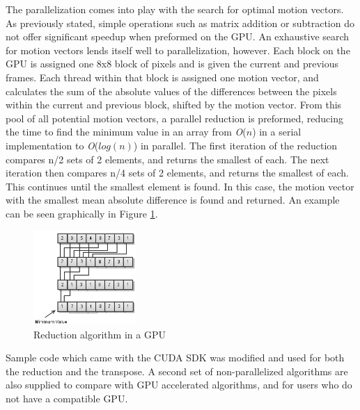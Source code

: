 \documentclass[10pt,twocolumn,twoside]{IEEEtran}
\renewcommand{\O}[1]{\textit{O}(\ensuremath{#1})}
\begin{document}
The parallelization comes into play with the search for optimal motion vectors. As previously stated, simple operations such as matrix addition or subtraction do not offer significant speedup when preformed on the GPU. An exhaustive search for motion vectors lends itself well to parallelization, however. Each block on the GPU is assigned one 8x8 block of pixels and is given the current and previous frames. Each thread within that block is assigned one motion vector, and calculates the sum of the absolute values of the differences between the pixels within the current and previous block, shifted by the motion vector. From this pool of all potential motion vectors, a parallel reduction is preformed, reducing the time to find the minimum value in an array from \O{n} in a serial implementation to \O{log(n)} in parallel. The first iteration of the reduction compares n/2 sets of 2 elements, and returns the smallest of each. The next iteration then compares n/4 sets of 2 elements, and returns the smallest of each. This continues until the smallest element is found. In this case, the motion vector with the smallest mean absolute difference is found and returned. An example can be seen graphically in Figure \ref{fig:reduction}.

\begin{figure}[htbp]
\begin{center}
\includegraphics[width=0.35\textwidth]{Images/reduction.png}
\caption{Reduction algorithm in a GPU}
\label{fig:reduction}
\end{center}
\end{figure}

Sample code which came with the CUDA SDK was modified and used for both the reduction and the transpose. A second set of non-parallelized algorithms are also supplied to compare with GPU accelerated algorithms, and for users who do not have a compatible GPU.
\end{document}
